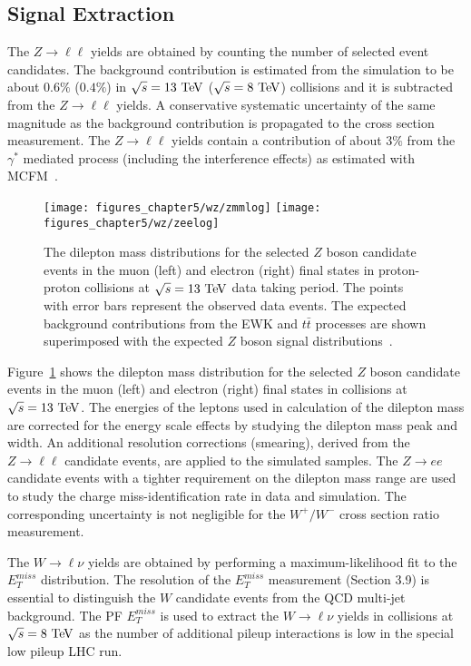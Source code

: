 \subsection{Signal Extraction}

The $Z\rightarrow \ell\ell$ yields are obtained by counting the number of selected event candidates. The background contribution is estimated from the simulation to be about $0.6\%$ ($0.4\%$) in $\sqrt{s}=13~\mathrm{Te\kern -0.1em V}$ ($\sqrt{s}=8~\mathrm{Te\kern -0.1em V}$) collisions and it is subtracted from the $Z\rightarrow \ell\ell$ yields. A conservative systematic uncertainty of the same magnitude as the background contribution is propagated to the cross section measurement. The $Z\rightarrow \ell\ell$ yields contain a contribution of about $3\%$ from the $\gamma^{*}$ mediated process (including the interference effects) as estimated with MCFM~\cite{Campbell:2010ff}. 
\begin{figure}[htbp]
\centering
\texttt{[image: figures\_chapter5/wz/zmmlog]}
\texttt{[image: figures\_chapter5/wz/zeelog]}
\caption{The dilepton mass distributions for the selected $Z$ boson candidate events in the muon (left) and electron (right) final states in proton-proton collisions at $\sqrt{s}=13~\mathrm{Te\kern -0.1em V}$ data taking period. The points with error bars represent the observed data events. The expected background contributions from the EWK and $t\bar{t}$ processes are shown superimposed with the expected $Z$ boson signal distributions~\cite{CMS-PAS-SMP-15-004}. 
\label{fig:z13}}
\end{figure}
Figure~\ref{fig:z13} shows the dilepton mass distribution for the selected $Z$ boson candidate events in the muon (left) and electron (right) final states in collisions at $\sqrt{s}=13~\mathrm{Te\kern -0.1em V}$. The energies of the leptons used in calculation of the dilepton mass are corrected for the energy scale effects by studying the dilepton mass peak and width. An additional resolution corrections (smearing), derived from the $Z \rightarrow \ell\ell$ candidate events, are applied to the simulated samples. The  $Z \rightarrow ee$ candidate events with a tighter requirement on the dilepton mass range are used to study the charge miss-identification rate in data and simulation. The corresponding uncertainty is not negligible for the $W^+/W^-$ cross section ratio measurement.      
 
 The $W \rightarrow \ell \nu$ yields are obtained by performing a maximum-likelihood fit to the $E_{T}^{miss}$ distribution. The resolution of the $E_{T}^{miss}$ measurement (Section 3.9) is essential to distinguish the $W$ candidate events from the QCD multi-jet background. The PF $E_{T}^{miss}$ is used to extract the $W \rightarrow \ell \nu$ yields in collisions at $\sqrt{s}=8~\mathrm{Te\kern -0.1em V}$ as the number of additional pileup interactions is low in the special low pileup LHC run. 
 
